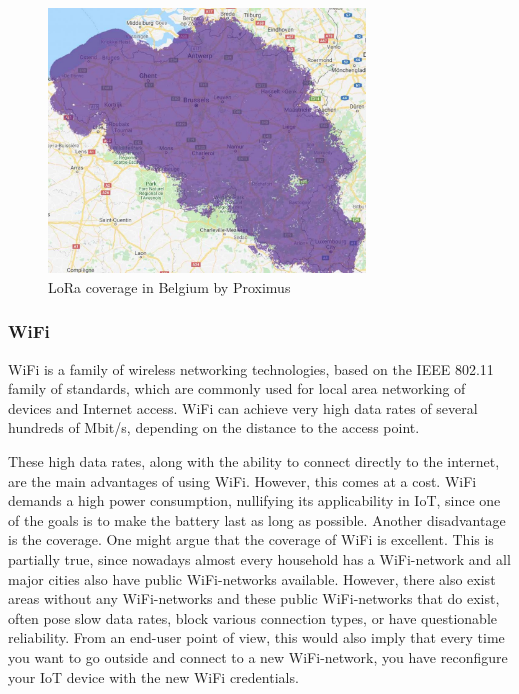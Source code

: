 \documentclass[12pt, a4paper]{article}
\newcommand{\lora}{LoRa}
\newcommand{\wifi}{WiFi}
\newcommand{\iot}{IoT}
\begin{document}
\begin{figure}[htbp]
\includegraphics[width=0.75\textwidth]{images/proximus-lora-coverage.jpg}
\centering
\caption{\lora{} coverage in Belgium by Proximus}
\end{figure}

\subsubsection{\wifi{}}
\wifi{} is a family of wireless networking technologies, based on the IEEE 802.11 family of standards, which are commonly used for local area networking of devices and Internet access. \wifi{} can achieve very high data rates of several hundreds of Mbit/s, depending on the distance to the access point.

These high data rates, along with the ability to connect directly to the internet, are the main advantages of using \wifi{}. However, this comes at a cost. \wifi{} demands a high power consumption, nullifying its applicability in \iot{}, since one of the goals is to make the battery last as long as possible. Another disadvantage is the coverage. One might argue that the coverage of \wifi{} is excellent. This is partially true, since nowadays almost every household has a \wifi{}-network and all major cities also have public \wifi{}-networks available. However, there also exist areas without any \wifi{}-networks and these public \wifi{}-networks that do exist, often pose slow data rates, block various connection types, or have questionable reliability. From an end-user point of view, this would also imply that every time you want to go outside and connect to a new \wifi{}-network, you have reconfigure your \iot{} device with the new \wifi{} credentials.
\end{document}
